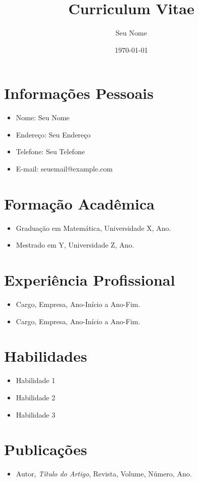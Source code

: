 \documentclass[a4paper,12pt]{article}
\begin{document}
\title{Curriculum Vitae}
\author{Seu Nome}
\date{\today}
\maketitle

\section*{Informações Pessoais}
\begin{itemize}
    \item Nome: Seu Nome
    \item Endereço: Seu Endereço
    \item Telefone: Seu Telefone
    \item E-mail: seuemail@example.com
\end{itemize}

\section*{Formação Acadêmica}
\begin{itemize}
    \item Graduação em Matemática, Universidade X, Ano.
    \item Mestrado em Y, Universidade Z, Ano.
\end{itemize}

\section*{Experiência Profissional}
\begin{itemize}
    \item Cargo, Empresa, Ano-Início a Ano-Fim.
    \item Cargo, Empresa, Ano-Início a Ano-Fim.
\end{itemize}

\section*{Habilidades}
\begin{itemize}
    \item Habilidade 1
    \item Habilidade 2
    \item Habilidade 3
\end{itemize}

\section*{Publicações}
\begin{itemize}
    \item Autor, \textit{Título do Artigo}, Revista, Volume, Número, Ano.
\end{itemize}
\end{document}
